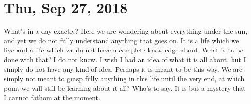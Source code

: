 \section{Thu, Sep 27, 2018}

What's in a day exactly? Here we are wondering about everything under the sun, and
yet we do not fully understand anything that goes on. It is a life which we live and
a life which we do not have a complete knowledge about. What is to be done with that?
I do not know. I wish I had an idea of what it is all about, but I simply do not have
any kind of idea. Perhaps it is meant to be this way. We are simply not meant to
grasp fully anything in this life until the very end, at which point we will still be
learning about it all? Who's to say. It is but a mystery that I cannot fathom at the
moment.

